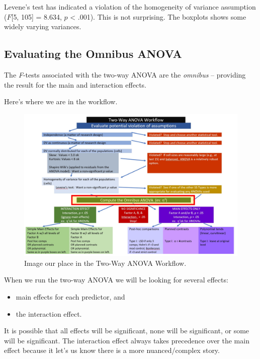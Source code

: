 \documentclass[
  11pt,
]{book}
\providecommand{\tightlist}{%
  \setlength{\itemsep}{0pt}\setlength{\parskip}{0pt}}
\begin{document}
Levene's test has indicated a violation of the homogeneity of variance assumption (\(F\){[}5, 105{]} = 8.634, \(p\) \textless{} .001). This is not surprising. The boxplots shows some widely varying variances.

\hypertarget{evaluating-the-omnibus-anova}{%
\subsection{Evaluating the Omnibus ANOVA}\label{evaluating-the-omnibus-anova}}

The \emph{F}-tests associated with the two-way ANOVA are the \emph{omnibus} -- providing the result for the main and interaction effects.

Here's where we are in the workflow.

\begin{figure}
\centering
\includegraphics{images/factorial/WrkFlw_Omnibus.jpg}
\caption{Image our place in the Two-Way ANOVA Workflow.}
\end{figure}

When we run the two-way ANOVA we will be looking for several effects:

\begin{itemize}
\tightlist
\item
  main effects for each predictor, and
\item
  the interaction effect.
\end{itemize}

It is possible that all effects will be significant, none will be significant, or some will be significant. The interaction effect always takes precedence over the main effect because it let's us know there is a more nuanced/complex story.
\end{document}
